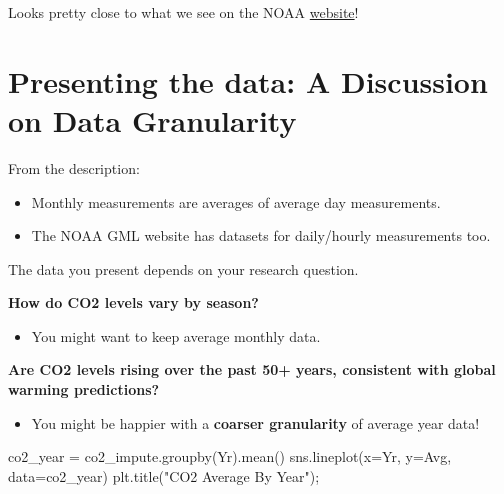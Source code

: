 \documentclass[
  letterpaper,
  DIV=11,
  numbers=noendperiod]{scrreprt}
\newenvironment{Shaded}{\begin{snugshade}}{\end{snugshade}}
\newcommand{\NormalTok}[1]{\textcolor[rgb]{0.00,0.23,0.31}{#1}}
\newcommand{\OperatorTok}[1]{\textcolor[rgb]{0.37,0.37,0.37}{#1}}
\newcommand{\StringTok}[1]{\textcolor[rgb]{0.13,0.47,0.30}{#1}}
\providecommand{\tightlist}{%
  \setlength{\itemsep}{0pt}\setlength{\parskip}{0pt}}\usepackage{longtable,booktabs,array}
\begin{document}
Looks pretty close to what we see on the NOAA
\href{https://gml.noaa.gov/ccgg/trends/}{website}!

\hypertarget{presenting-the-data-a-discussion-on-data-granularity}{%
\section{Presenting the data: A Discussion on Data
Granularity}\label{presenting-the-data-a-discussion-on-data-granularity}}

From the description:

\begin{itemize}
\tightlist
\item
  Monthly measurements are averages of average day measurements.
\item
  The NOAA GML website has datasets for daily/hourly measurements too.
\end{itemize}

The data you present depends on your research question.

\textbf{How do CO2 levels vary by season?}

\begin{itemize}
\tightlist
\item
  You might want to keep average monthly data.
\end{itemize}

\textbf{Are CO2 levels rising over the past 50+ years, consistent with
global warming predictions?}

\begin{itemize}
\tightlist
\item
  You might be happier with a \textbf{coarser granularity} of average
  year data!
\end{itemize}

\begin{Shaded}
\begin{Highlighting}[]
\NormalTok{co2\_year }\OperatorTok{=}\NormalTok{ co2\_impute.groupby(}\StringTok{\textquotesingle{}Yr\textquotesingle{}}\NormalTok{).mean()}
\NormalTok{sns.lineplot(x}\OperatorTok{=}\StringTok{\textquotesingle{}Yr\textquotesingle{}}\NormalTok{, y}\OperatorTok{=}\StringTok{\textquotesingle{}Avg\textquotesingle{}}\NormalTok{, data}\OperatorTok{=}\NormalTok{co2\_year)}
\NormalTok{plt.title(}\StringTok{"CO2 Average By Year"}\NormalTok{)}\OperatorTok{;}
\end{Highlighting}
\end{Shaded}
\end{document}
